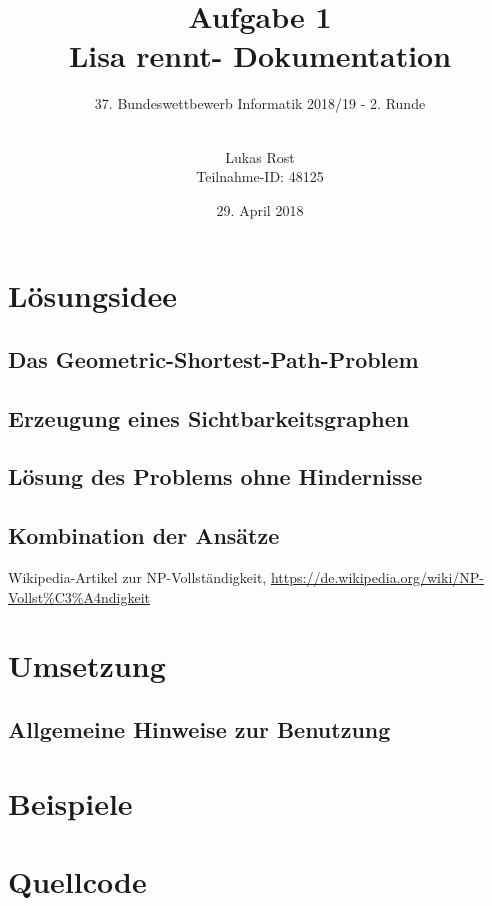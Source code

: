 \documentclass[a4paper, notitlepage, 12pt]{scrartcl}
\author{Lukas Rost \\ \small{Teilnahme-ID: 48125}}
\title{Aufgabe 1 \\ \glqq Lisa rennt\grqq  - Dokumentation}
\subtitle{37. Bundeswettbewerb Informatik 2018/19 - 2. Runde \\~\\}
\date{29. April 2018}
\begin{document}
\renewcommand{\contentsname}{\centerline{Inhaltsverzeichnis}}
 \maketitle
 \tableofcontents
 \thispagestyle{empty}
 \newpage
 \setcounter{page}{1}
 
 \section{Lösungsidee}
 \subsection{Das Geometric-Shortest-Path-Problem}
 \subsection{Erzeugung eines Sichtbarkeitsgraphen}
 \subsection{Lösung des Problems ohne Hindernisse}
 \subsection{Kombination der Ansätze}
\begin{thebibliography}{xx}
 Wikipedia-Artikel zur NP-Vollständigkeit, \url{https://de.wikipedia.org/wiki/NP-Vollst\%C3\%A4ndigkeit}
\end{thebibliography}

\section{Umsetzung}
\subsection{Allgemeine Hinweise zur Benutzung}

\section{Beispiele}

 \section{Quellcode}
 \renewcommand{\listingscaption}{Quellcode}
 
 
\end{document}

